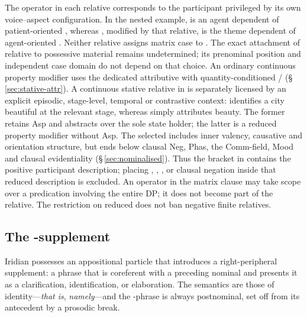 The operator in each relative corresponds to the participant privileged by its
own voice--aspect configuration. In the nested example,  is an
agent dependent of patient-oriented , whereas ,
modified by that relative, is the theme dependent of agent-oriented
. Neither relative assigns matrix case to .
The exact attachment of  relative to possessive material remains
undetermined; its prenominal position and independent case domain do not depend
on that choice. An ordinary continuous property modifier uses the dedicated
attributive with quantity-conditioned /
(§\,\ref{sec:stative-attr}). A continuous stative relative in 
is separately licensed by an explicit episodic, stage-level, temporal or
contrastive context:  identifies a city beautiful at the
relevant stage, whereas  simply attributes beauty. The former
retains Asp and abstracts over the sole state holder; the latter is a reduced
property modifier without Asp. The
selected  includes inner valency, causative and orientation
structure, but ends below clausal Neg, Phas, the Comm-field, Mood and clausal
evidentiality (§\,\ref{sec:nominalised}). Thus the bracket in
 contains the positive participant description;
placing , , ,  or clausal negation
inside that reduced description is excluded. An operator in the matrix clause
may take scope over a predication involving the entire DP; it does not become
part of the relative. The restriction on reduced  does not ban
negative finite relatives.

\subsection{The -supplement}
\label{sec:nm-appos}

Iridian possesses an appositional particle  that introduces a
right-peripheral supplement: a phrase that is coreferent with a preceding
nominal and presents it as a clarification, identification, or elaboration. The
semantics are those of identity---\textit{that is}, \textit{namely}---and the
-phrase is always postnominal, set off from its antecedent by a prosodic
break.

